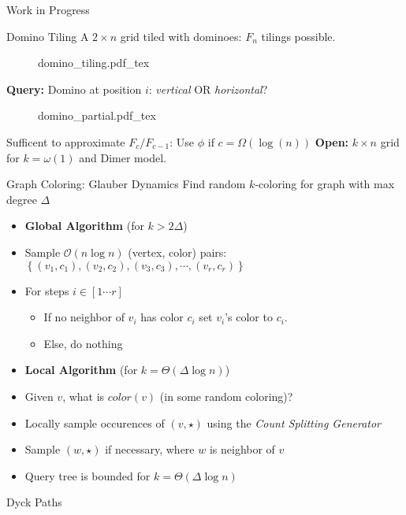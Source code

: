 \begin{block}{Work in Progress}



\begin{alertblock}{Domino Tiling}
A $2\times n$ grid tiled with dominoes: $F_n$ tilings possible.
\begin{figure}[h!]\centering
    \def\svgwidth{0.8\columnwidth}
    {domino_tiling.pdf_tex}
\end{figure}
\textbf{Query:} Domino at position $i$: \emph{vertical} OR \emph{horizontal}?
\begin{figure}[h!]\centering
    \def\svgwidth{0.8\columnwidth}
    {domino_partial.pdf_tex}
\end{figure}
Sufficent to approximate $F_c/F_{c-1}$: Use $\phi$ if $c = \Omega(\log(n))$
\textbf{Open:} $k\times n$ grid for $k = \omega(1)$ and Dimer model.
\end{alertblock}


\begin{alertblock}{Graph Coloring: Glauber Dynamics}
Find random $k$-coloring for graph with max degree $\Delta$
\begin{itemize}
    \item [] \textbf{Global Algorithm} (for $k > 2\Delta$)
    \item Sample $\mathcal O(n\log n)$ (vertex, color) pairs:
          $\left\{ (v_1, c_1), (v_2, c_2), (v_3, c_3), \cdots, (v_r, c_r)\right\}$
    \item For steps $i\in [1\cdots r]$
    \begin{itemize}
        \item If no neighbor of $v_i$  has color $c_i$ set $v_i$'s color to $c_i$.
        \item Else, do nothing
    \end{itemize}
\end{itemize}
\begin{itemize}
    \item [] \textbf{Local Algorithm} (for $k = \Theta(\Delta\log n)$)
    \item Given $v$, what is $color(v)$ (in some random coloring)?
    \item Locally sample occurences of $(v, \star)$ using the \emph{Count Splitting Generator}
    \item Sample $(w, \star)$ if necessary, where $w$ is neighbor of $v$
    \item Query tree is bounded for $k = \Theta(\Delta\log n)$
\end{itemize}
\end{alertblock}


\begin{alertblock}{Dyck Paths}
\end{alertblock}



\end{block}
